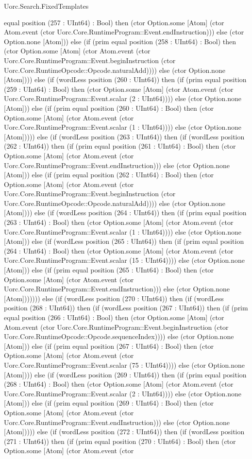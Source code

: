 \begin{lexlean}{Uorc.Search.FixedTemplates}
\begin{semanticmodule}
{equal position (257 : UInt64) : Bool) then (ctor Option.some [Atom] (ctor Atom.event (ctor Uorc.Core.RuntimeProgram::Event.endInstruction))) else (ctor Option.none [Atom])) else (if (prim equal position (258 : UInt64) : Bool) then (ctor Option.some [Atom] (ctor Atom.event (ctor Uorc.Core.RuntimeProgram::Event.beginInstruction (ctor Uorc.Core.RuntimeOpcode::Opcode.naturalAdd)))) else (ctor Option.none [Atom]))) else (if (wordLess position (260 : UInt64)) then (if (prim equal position (259 : UInt64) : Bool) then (ctor Option.some [Atom] (ctor Atom.event (ctor Uorc.Core.RuntimeProgram::Event.scalar (2 : UInt64)))) else (ctor Option.none [Atom])) else (if (prim equal position (260 : UInt64) : Bool) then (ctor Option.some [Atom] (ctor Atom.event (ctor Uorc.Core.RuntimeProgram::Event.scalar (1 : UInt64)))) else (ctor Option.none [Atom])))) else (if (wordLess position (263 : UInt64)) then (if (wordLess position (262 : UInt64)) then (if (prim equal position (261 : UInt64) : Bool) then (ctor Option.some [Atom] (ctor Atom.event (ctor Uorc.Core.RuntimeProgram::Event.endInstruction))) else (ctor Option.none [Atom])) else (if (prim equal position (262 : UInt64) : Bool) then (ctor Option.some [Atom] (ctor Atom.event (ctor Uorc.Core.RuntimeProgram::Event.beginInstruction (ctor Uorc.Core.RuntimeOpcode::Opcode.naturalAdd)))) else (ctor Option.none [Atom]))) else (if (wordLess position (264 : UInt64)) then (if (prim equal position (263 : UInt64) : Bool) then (ctor Option.some [Atom] (ctor Atom.event (ctor Uorc.Core.RuntimeProgram::Event.scalar (1 : UInt64)))) else (ctor Option.none [Atom])) else (if (wordLess position (265 : UInt64)) then (if (prim equal position (264 : UInt64) : Bool) then (ctor Option.some [Atom] (ctor Atom.event (ctor Uorc.Core.RuntimeProgram::Event.scalar (15 : UInt64)))) else (ctor Option.none [Atom])) else (if (prim equal position (265 : UInt64) : Bool) then (ctor Option.some [Atom] (ctor Atom.event (ctor Uorc.Core.RuntimeProgram::Event.endInstruction))) else (ctor Option.none [Atom])))))) else (if (wordLess position (270 : UInt64)) then (if (wordLess position (268 : UInt64)) then (if (wordLess position (267 : UInt64)) then (if (prim equal position (266 : UInt64) : Bool) then (ctor Option.some [Atom] (ctor Atom.event (ctor Uorc.Core.RuntimeProgram::Event.beginInstruction (ctor Uorc.Core.RuntimeOpcode::Opcode.sequenceIndex)))) else (ctor Option.none [Atom])) else (if (prim equal position (267 : UInt64) : Bool) then (ctor Option.some [Atom] (ctor Atom.event (ctor Uorc.Core.RuntimeProgram::Event.scalar (75 : UInt64)))) else (ctor Option.none [Atom]))) else (if (wordLess position (269 : UInt64)) then (if (prim equal position (268 : UInt64) : Bool) then (ctor Option.some [Atom] (ctor Atom.event (ctor Uorc.Core.RuntimeProgram::Event.scalar (2 : UInt64)))) else (ctor Option.none [Atom])) else (if (prim equal position (269 : UInt64) : Bool) then (ctor Option.some [Atom] (ctor Atom.event (ctor Uorc.Core.RuntimeProgram::Event.endInstruction))) else (ctor Option.none [Atom])))) else (if (wordLess position (272 : UInt64)) then (if (wordLess position (271 : UInt64)) then (if (prim equal position (270 : UInt64) : Bool) then (ctor Option.some [Atom] (ctor Atom.event (ctor }
\end{semanticmodule}
\end{lexlean}

